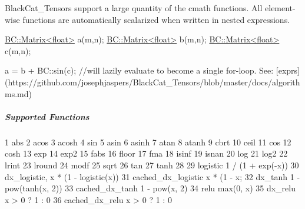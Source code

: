 Black\+Cat\+\_\+\+Tensor\textquotesingle{}s support a large quantity of the cmath functions. All element-\/wise functions are automatically scalarized when written in nested expressions.


\begin{DoxyCode}
\hyperlink{classBC_1_1tensors_1_1Tensor__Base}{BC::Matrix<float>} a(m,n);
\hyperlink{classBC_1_1tensors_1_1Tensor__Base}{BC::Matrix<float>} b(m,n);
\hyperlink{classBC_1_1tensors_1_1Tensor__Base}{BC::Matrix<float>} c(m,n);

a =  b + BC::sin(c); \textcolor{comment}{//will lazily evaluate to become a single for-loop. See:
       [exprs](https://github.com/josephjaspers/BlackCat\_Tensors/blob/master/docs/algorithms.md)}
\end{DoxyCode}


\subparagraph*{Supported Functions}


\begin{DoxyCode}
1 abs
2 acos
3 acosh
4 sin
5 asin
6 asinh
7 atan
8 atanh
9 cbrt
10 ceil
11 cos
12 cosh
13 exp
14 exp2
15 fabs
16 floor
17 fma
18 isinf
19 isnan
20 log
21 log2
22 lrint
23 lround
24 modf
25 sqrt
26 tan
27 tanh
28 
29 logistic              1 / (1 + exp(-x))
30 dx\_logistic,          x * (1 - logistic(x))
31 cached\_dx\_logistic    x * (1 - x;
32 dx\_tanh               1 - pow(tanh(x, 2))
33 cached\_dx\_tanh        1 - pow(x, 2)
34 relu                  max(0, x)
35 dx\_relu               x > 0 ? 1 : 0
36 cached\_dx\_relu        x > 0 ? 1 : 0
\end{DoxyCode}
 